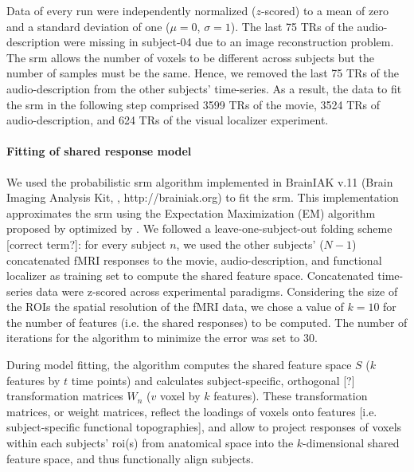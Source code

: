 Data of every run were independently normalized ($z$-scored) to a mean of zero
and a standard deviation of one ($\mu=0$, $\sigma=1$).
%
The last 75 TRs of the audio-description were missing in subject-04 due to an
image reconstruction problem.
%
The \ac{srm} allows the number of voxels to be different across subjects but the
number of samples must be the same.
%
Hence, we removed the last 75 TRs of the audio-description from the other
subjects' time-series.
As a result, the data to fit the \ac{srm} in the following step comprised 3599
TRs of the movie, 3524 TRs of audio-description, and 624 TRs of the visual
localizer experiment.



\paragraph{Fitting of shared response model}



We used the probabilistic \ac{srm} algorithm implemented in BrainIAK v.11 (Brain
Imaging Analysis Kit, \citet{kumar2020brainiak, kumar2020brainiaktutorial},
http://brainiak.org) to fit the \ac{srm}.
%
This implementation approximates the \ac{srm} using the Expectation Maximization
(EM) algorithm proposed by \citep{chen2015reduced} optimized by
\citet{anderson2016enabling}.
%
We followed a leave-one-subject-out folding scheme [correct term?]:
%
for every subject $n$, we used the other subjects' ($N-1$) concatenated fMRI
responses to the movie, audio-description, and functional localizer as training
set to compute the shared feature space.
%
Concatenated time-series data were z-scored across experimental
paradigms.
Considering the size of the ROIs the spatial resolution of the fMRI data, we
chose a value of $k=10$ for the number of features (i.e. the shared responses)
to be computed.
The number of iterations for the algorithm to minimize the error was set to 30.

%
During model fitting, the algorithm computes the shared feature space $S$ ($k$
features by $t$ time points) and calculates subject-specific, orthogonal [?]
transformation matrices $W_{n}$ ($v$ voxel by $k$ features).
%
These transformation matrices, or weight matrices, reflect the loadings of
voxels onto features [i.e. subject-specific functional topographies], and allow
to project responses of voxels within each subjects' \ac{roi}(s) from anatomical
space into the $k$-dimensional shared feature space, and thus functionally align
subjects.

